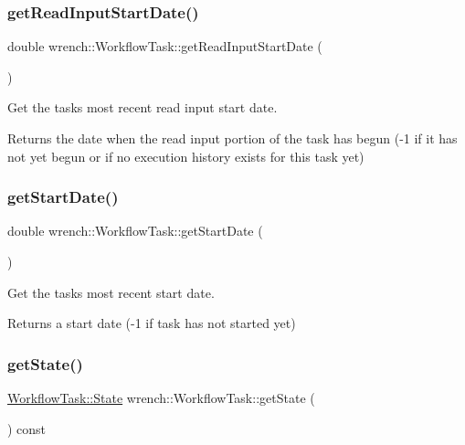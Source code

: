 \subsubsection{\texorpdfstring{get\+Read\+Input\+Start\+Date()}{getReadInputStartDate()}}
{\footnotesize\ttfamily double wrench\+::\+Workflow\+Task\+::get\+Read\+Input\+Start\+Date (\begin{DoxyParamCaption}{ }\end{DoxyParamCaption})}



Get the task\textquotesingle{}s most recent read input start date. 

\begin{DoxyReturn}{Returns}
the date when the read input portion of the task has begun (-\/1 if it has not yet begun or if no execution history exists for this task yet) 
\end{DoxyReturn}
\mbox{\label{classwrench_1_1_workflow_task_a17462dd156a6080653f96a1abbbb379d}} 
\subsubsection{\texorpdfstring{get\+Start\+Date()}{getStartDate()}}
{\footnotesize\ttfamily double wrench\+::\+Workflow\+Task\+::get\+Start\+Date (\begin{DoxyParamCaption}{ }\end{DoxyParamCaption})}



Get the task\textquotesingle{}s most recent start date. 

\begin{DoxyReturn}{Returns}
a start date (-\/1 if task has not started yet) 
\end{DoxyReturn}
\mbox{\label{classwrench_1_1_workflow_task_a990a3e96d944c37cb896a7ca0d84a4db}} 
\subsubsection{\texorpdfstring{get\+State()}{getState()}}
{\footnotesize\ttfamily \hyperlink{classwrench_1_1_workflow_task_a1184f3d7aea21e1c87a9b17e84f1f92a}{Workflow\+Task\+::\+State} wrench\+::\+Workflow\+Task\+::get\+State (\begin{DoxyParamCaption}{ }\end{DoxyParamCaption}) const}



